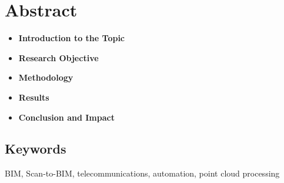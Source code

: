\chapter*{Abstract}



\begin{itemize}
    \item \textbf{Introduction to the Topic}  

    \item \textbf{Research Objective}  

    \item \textbf{Methodology}  

    \item \textbf{Results}  

    \item \textbf{Conclusion and Impact}  
\end{itemize}


\section*{Keywords}
BIM, Scan-to-BIM, telecommunications, automation, point cloud processing